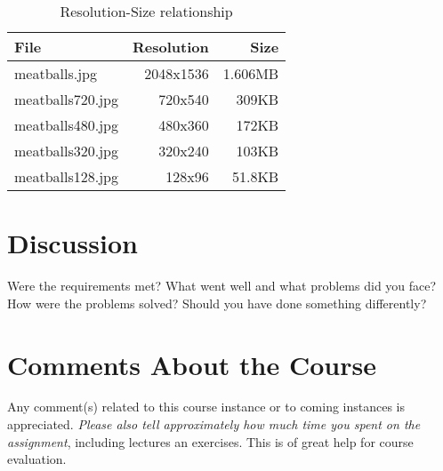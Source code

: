 \documentclass[a4paper]{scrartcl}
\begin{document}

 \begin{table}[h]
   \centering
   \begin{tabular}{|l|r|r|}
     \hline
     File & Resolution & Size\\
     \hline
     meatballs.jpg & 2048x1536 & 1.606MB\\
     \hline
     meatballs720.jpg & 720x540 & 309KB\\
	 \hline
	 meatballs480.jpg & 480x360 & 172KB\\   
     \hline
     meatballs320.jpg & 320x240 & 103KB\\
     \hline
     meatballs128.jpg & 128x96 & 51.8KB\\
     \hline
   \end{tabular}
   \caption{Resolution-Size relationship}
   \label{tab:ressize}
 \end{table}

\section{Discussion}

Were the requirements met? What went well and what problems did you face? How were the problems solved? Should you have done something differently?

\section{Comments About the Course}

Any comment(s) related to this course instance or to coming instances is appreciated. \textit{Please also tell approximately how much time you spent on the assignment}, including lectures an exercises. This is of great help for course evaluation.
\end{document}
